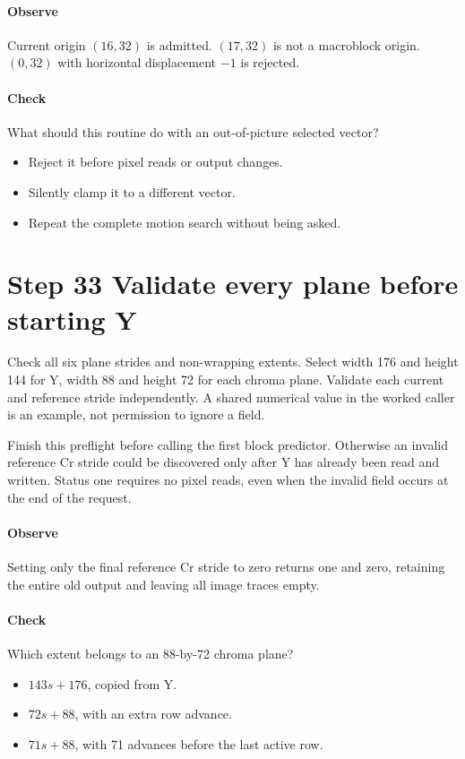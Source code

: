 \paragraph{Observe} Current origin $(16,32)$ is admitted. $(17,32)$ is not a
macroblock origin. $(0,32)$ with horizontal displacement $-1$ is rejected.
\paragraph{Check} What should this routine do with an out-of-picture selected vector?
\begin{itemize}
  \item[A.] Reject it before pixel reads or output changes.
  \item[B.] Silently clamp it to a different vector.
  \item[C.] Repeat the complete motion search without being asked.
\end{itemize}

\section{Step 33 Validate every plane before starting Y}\label{h263-macroblock-s03}
Check all six plane strides and non-wrapping extents. Select width 176 and height
144 for Y, width 88 and height 72 for each chroma plane. Validate each current and
reference stride independently. A shared numerical value in the worked caller
is an example, not permission to ignore a field.

Finish this preflight before calling the first block predictor. Otherwise an
invalid reference Cr stride could be discovered only after Y has already been
read and written. Status one requires no pixel reads, even when the invalid
field occurs at the end of the request.

\paragraph{Observe} Setting only the final reference Cr stride to zero returns
one and zero, retaining the entire old output and leaving all image traces empty.
\paragraph{Check} Which extent belongs to an 88-by-72 chroma plane?
\begin{itemize}
  \item[A.] $143s+176$, copied from Y.
  \item[B.] $72s+88$, with an extra row advance.
  \item[C.] $71s+88$, with 71 advances before the last active row.
\end{itemize}

